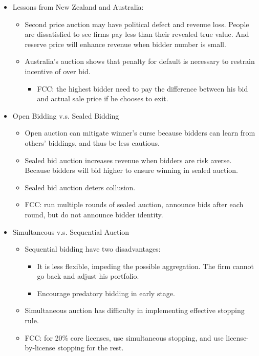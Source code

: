 \documentclass{book}
\theoremstyle{plain}
\theoremstyle{definition}
\begin{document}
\vspace{1em}
\noindent
\begin{itemize}
	\item Lessons from New Zealand and Australia:
	\begin{itemize}
		\item Second price auction may have political defect and revenue loss. People are dissatisfied to see firms pay less than their revealed true value. And reserve price will enhance revenue when bidder number is small.
		\item Australia's auction shows that penalty for default is necessary to restrain incentive of over bid.
		\begin{itemize}
			\item FCC: the highest bidder need to pay the difference between his bid and actual sale price if he chooses to exit.
		\end{itemize}
	\end{itemize}

	\item Open Bidding v.s. Sealed Bidding
	\begin{itemize}
		\item Open auction can mitigate winner's curse because bidders can learn from others' biddings, and thus be less cautious.
		\item Sealed bid auction increases revenue when bidders are risk averse. Because bidders will bid higher to ensure winning in sealed auction.
		\item Sealed bid auction deters collusion.
		\item FCC: run multiple rounds of sealed auction, announce bids after each round, but do not announce bidder identity.
	\end{itemize}

	\item Simultaneous v.s. Sequential Auction
	\begin{itemize}
		\item Sequential bidding have two disadvantages:
		\begin{itemize}
			\item It is less flexible, impeding the possible aggregation. The firm cannot go back and adjust his portfolio.
			\item Encourage predatory bidding in early stage.
		\end{itemize}
		\item Simultaneous auction has difficulty in implementing effective stopping rule.
		\item FCC: for 20\% core licenses, use simultaneous stopping, and use license-by-license stopping for the rest.
	\end{itemize}


\end{itemize}
\end{document}
